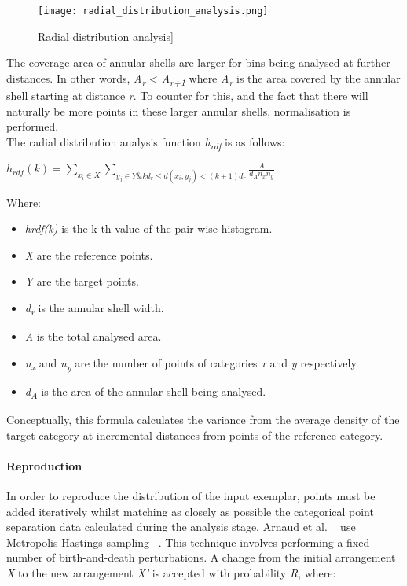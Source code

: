 \begin{figure}[h]
  \centering
	\label{Radial distribution analysis}
	\texttt{[image: radial\_distribution\_analysis.png]}
	\caption{Radial distribution analysis]}
\end{figure}

The coverage area of annular shells are larger for bins being analysed at further distances. In other words, \textit{A\textsubscript{r}} < \textit{A\textsubscript{r+1}} where \textit{A\textsubscript{r}} is the area covered by the annular shell starting at distance \textit{r}. To counter for this, and the fact that there will naturally be more points in these larger annular shells, normalisation is performed. \\

The radial distribution analysis function \textit{h\textsubscript{rdf}} is as follows:\\
\begin{center}	
$h_{rdf}(k) = \sum_{x_{i} \in X} \sum_{y_{j} \in Y \&  
kd_{r} \leq d(x_{i}, y_{j}) < (k+1)d_{r} } \frac{A}{d_{A}n_{x}n_{y}} $
\end{center}
Where:
\begin{itemize}
\item \textit{hrdf(k)} is the k-th value of the pair wise histogram.
\item \textit{X} are the reference points.
\item \textit{Y} are the target points.
\item \textit{d\textsubscript{r}} is the annular shell width.
\item \textit{A} is the total analysed area.
\item \textit{n\textsubscript{x}} and \textit{n\textsubscript{y}} are the number of points of categories \textit{x} and \textit{y} respectively.
\item \textit{d\textsubscript{A}} is the area of the annular shell being analysed.
\end{itemize}

Conceptually, this formula calculates the variance from the average density of the target category at incremental distances from points of the reference category.

\paragraph{Reproduction}

In order to reproduce the distribution of the input exemplar, points must be added iteratively whilst matching as closely as possible the categorical point separation data calculated during the analysis stage. Arnaud et al. ~\cite{Emilien} use Metropolis-Hastings sampling ~\cite{Hurtut2009}. This technique involves performing a fixed number of birth-and-death perturbations. A change from the initial arrangement \textit{X} to the new arrangement \textit{X'} is accepted with probability \textit{R}, where:


